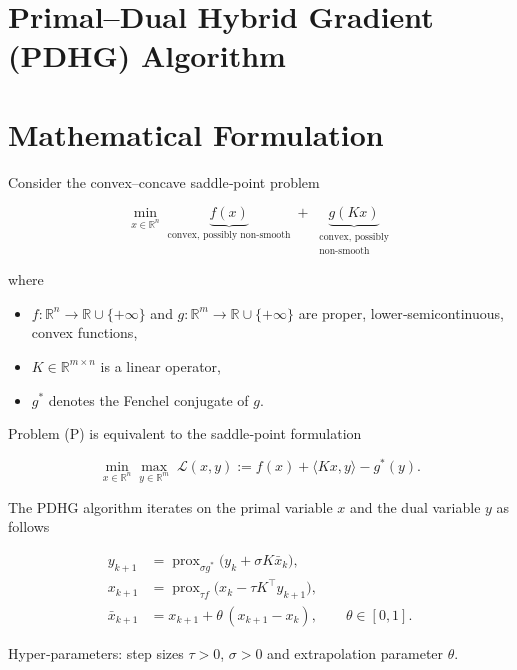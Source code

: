 \documentclass{article}
\newcommand{\prox}{\operatorname{prox}}
\begin{document}
\section*{Primal–Dual Hybrid Gradient (PDHG) Algorithm}

\section*{Mathematical Formulation}
Consider the convex–concave saddle‑point problem  

\[
\min_{x\in\mathbb R^{n}} \; \underbrace{f(x)}_{\text{convex, possibly non‑smooth}}
\;+\;
\underbrace{g(Kx)}_{\substack{\text{convex, possibly}\\\text{non‑smooth}}}
\tag{P}
\]

where  

\begin{itemize}
  \item $f:\mathbb R^{n}\to\mathbb R\cup\{+\infty\}$ and $g:\mathbb R^{m}\to\mathbb R\cup\{+\infty\}$ are proper, lower‑semicontinuous, convex functions,
  \item $K\in\mathbb R^{m\times n}$ is a linear operator,
  \item $g^{*}$ denotes the Fenchel conjugate of $g$.
\end{itemize}

Problem (P) is equivalent to the saddle‑point formulation  

\[
\min_{x\in\mathbb R^{n}}\max_{y\in\mathbb R^{m}} \; \mathcal L(x,y)
:= f(x)+\langle Kx,y\rangle - g^{*}(y).
\tag{1}
\]

The PDHG algorithm iterates on the primal variable $x$ and the dual variable $y$ as follows  

\[
\boxed{
\begin{aligned}
y_{k+1} &= \prox_{\sigma g^{*}}\!\bigl(y_{k}+ \sigma K\bar x_{k}\bigr), \tag{2a}\\[4pt]
x_{k+1} &= \prox_{\tau f}\!\bigl(x_{k}-\tau K^{\top} y_{k+1}\bigr), \tag{2b}\\[4pt]
\bar x_{k+1} &= x_{k+1}+ \theta\,(x_{k+1}-x_{k}), \qquad \theta\in[0,1]. \tag{2c}
\end{aligned}}
\]

Hyper‑parameters: step sizes $\tau>0$, $\sigma>0$ and extrapolation parameter $\theta$.
\end{document}
